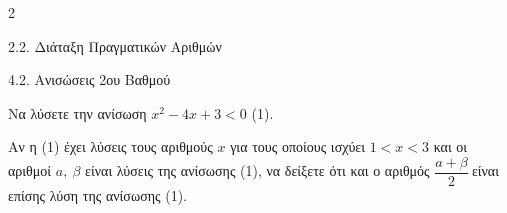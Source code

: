\begin{ylh}{2}
    \item 2.2. Διάταξη Πραγματικών Αριθμών
    \item 4.2. Ανισώσεις 2ου Βαθμού
\end{ylh}

\begin{alist}
\item Να λύσετε την ανίσωση $x^{2} - 4x + 3 < 0$ (1).
\item Αν η (1) έχει λύσεις τους αριθμούς $x$ για τους οποίους ισχύει $1 < x < 3$ και οι αριθμοί $a,\ \beta$ είναι λύσεις της ανίσωσης (1), να δείξετε ότι και ο αριθμός $\dfrac{a + \beta}{2}\ $είναι επίσης λύση της ανίσωσης (1).
\end{alist}


